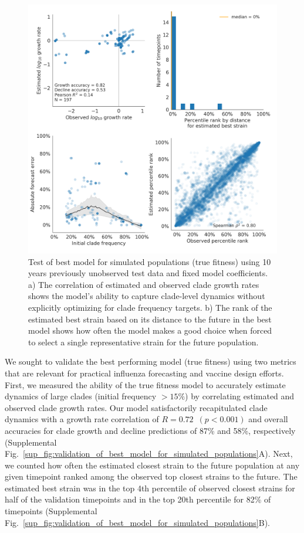 \begin{figure}[ht]
  \begin{center}
  \includegraphics[width=\textwidth]{figures/test-of-best-model-for-simulated-populations.png}
  \caption{
  Test of best model for simulated populations (true fitness) using 10 years previously unobserved test data and fixed model coefficients.
  a) The correlation of estimated and observed clade growth rates shows the model's ability to capture clade-level dynamics without explicitly optimizing for clade frequency targets.
  b) The rank of the estimated best strain based on its distance to the future in the best model shows how often the model makes a good choice when forced to select a single representative strain for the future population.
  }
  \label{fig:test_of_best_model_for_simulated_populations}
  \end{center}
\end{figure}

We sought to validate the best performing model (true fitness) using two metrics that are relevant for practical influenza forecasting and vaccine design efforts.
First, we measured the ability of the true fitness model to accurately estimate dynamics of large clades (initial frequency $>15\%$) by correlating estimated and observed clade growth rates.
Our model satisfactorily recapitulated clade dynamics with a growth rate correlation of $R = 0.72$~$(p < 0.001)$ and overall accuracies for clade growth and decline predictions of 87\% and 58\%, respectively (Supplemental Fig.~\ref{sup_fig:validation_of_best_model_for_simulated_populations}A).
Next, we counted how often the estimated closest strain to the future population at any given timepoint ranked among the observed top closest strains to the future.
The estimated best strain was in the top 4th percentile of observed closest strains for half of the validation timepoints and in the top 20th percentile for 82\% of timepoints (Supplemental Fig.~\ref{sup_fig:validation_of_best_model_for_simulated_populations}B).

